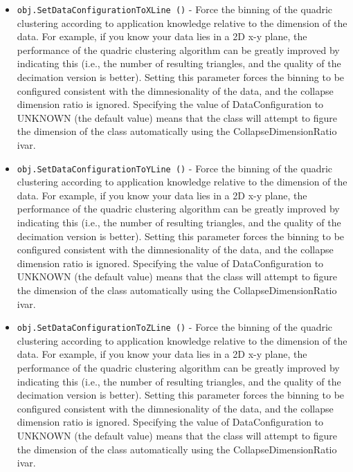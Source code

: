 \begin{itemize}
\item  \verb|obj.SetDataConfigurationToXLine ()| -  Force the binning of the quadric clustering according to application
 knowledge relative to the dimension of the data. For example, if you
 know your data lies in a 2D x-y plane, the performance of the quadric
 clustering algorithm can be greatly improved by indicating this (i.e.,
 the number of resulting triangles, and the quality of the decimation
 version is better). Setting this parameter forces the binning to be
 configured consistent with the dimnesionality of the data, and the
 collapse dimension ratio is ignored. Specifying the value of
 DataConfiguration to UNKNOWN (the default value) means that the class
 will attempt to figure the dimension of the class automatically using
 the CollapseDimensionRatio ivar.

\item  \verb|obj.SetDataConfigurationToYLine ()| -  Force the binning of the quadric clustering according to application
 knowledge relative to the dimension of the data. For example, if you
 know your data lies in a 2D x-y plane, the performance of the quadric
 clustering algorithm can be greatly improved by indicating this (i.e.,
 the number of resulting triangles, and the quality of the decimation
 version is better). Setting this parameter forces the binning to be
 configured consistent with the dimnesionality of the data, and the
 collapse dimension ratio is ignored. Specifying the value of
 DataConfiguration to UNKNOWN (the default value) means that the class
 will attempt to figure the dimension of the class automatically using
 the CollapseDimensionRatio ivar.

\item  \verb|obj.SetDataConfigurationToZLine ()| -  Force the binning of the quadric clustering according to application
 knowledge relative to the dimension of the data. For example, if you
 know your data lies in a 2D x-y plane, the performance of the quadric
 clustering algorithm can be greatly improved by indicating this (i.e.,
 the number of resulting triangles, and the quality of the decimation
 version is better). Setting this parameter forces the binning to be
 configured consistent with the dimnesionality of the data, and the
 collapse dimension ratio is ignored. Specifying the value of
 DataConfiguration to UNKNOWN (the default value) means that the class
 will attempt to figure the dimension of the class automatically using
 the CollapseDimensionRatio ivar.


\end{itemize}
